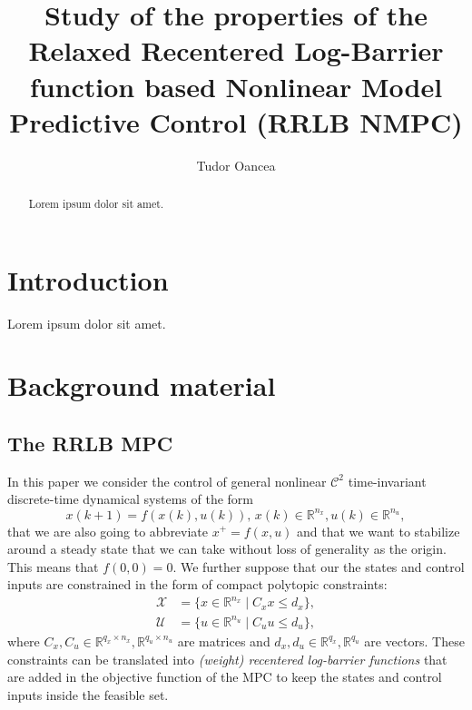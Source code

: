 \documentclass[conference]{IEEEtran}
\theoremstyle{definition}
\theoremstyle{remark}
\newcommand{\R}{\mathbb{R}}
\newcommand{\calC}{\mathcal{C}}
\newcommand{\ctwo}{\calC^2}
\begin{document}
\title{Study of the properties of the Relaxed Recentered Log-Barrier function based Nonlinear Model Predictive Control (RRLB NMPC)}

\author{Tudor Oancea}%
        

\maketitle

\begin{abstract}
    Lorem ipsum dolor sit amet.
\end{abstract}

\section{Introduction}
Lorem ipsum dolor sit amet.




\section{Background material}

\subsection{The RRLB MPC}

In this paper we consider the control of general nonlinear $\ctwo$ time-invariant discrete-time dynamical systems of the form 
\begin{equation}
	\label{eq:sys}
	x(k+1) = f(x(k),u(k)),\, x(k)\in\R^{n_x}, u(k)\in\R^{n_u},
\end{equation}
that we are also going to abbreviate $x^+ = f(x,u)$ and that we want to stabilize around a steady state that we can take without loss of generality as the origin. 
This means that $f(0,0) = 0$.
We further suppose that our the states and control inputs are constrained in the form of compact polytopic constraints:
\begin{equation}
	\label{eq:constr}
	\begin{aligned}
		\mathcal{X} &= \{x\in\R^{n_x} \mid C_x x \leq d_x \},\\
		\mathcal{U} &= \{u\in\R^{n_u} \mid C_u u \leq d_u\},
	\end{aligned}
\end{equation}
where $C_x, C_u \in \R^{q_x \times n_x}, \R^{q_u \times n_u}$ are matrices and $d_x, d_u \in \R^{q_x}, \R^{q_u}$ are vectors.
These constraints can be translated into \textit{(weight) recentered log-barrier functions} that are added in the objective function of the MPC to keep the states and control inputs inside the feasible set.
\end{document}
